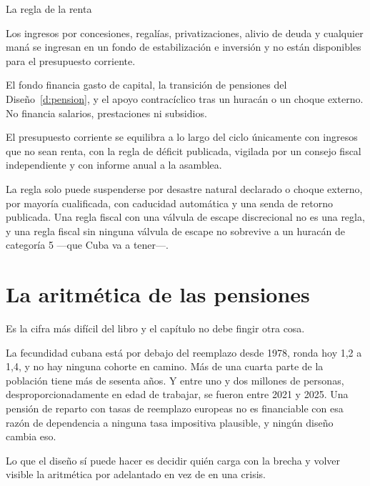 \begin{design}{La regla de la renta}
\label{d:rentrule}
\begin{rules}
 Los ingresos por concesiones, regalías, privatizaciones, alivio de
deuda y cualquier maná se ingresan en un fondo de estabilización e inversión y no
están disponibles para el presupuesto corriente.

 El fondo financia gasto de capital, la transición de pensiones
del Diseño~\ref{d:pension}, y el apoyo contracíclico tras un huracán o un choque
externo. No financia salarios, prestaciones ni subsidios.

 El presupuesto corriente se equilibra a lo largo del ciclo únicamente con
ingresos que no sean renta, con la regla de déficit publicada, vigilada por un consejo
fiscal independiente y con informe anual a la asamblea.

 La regla solo puede suspenderse por desastre natural declarado o choque
externo, por mayoría cualificada, con caducidad automática y una senda de retorno
publicada. Una regla fiscal con una válvula de escape discrecional no es una regla, y
una regla fiscal sin ninguna válvula de escape no sobrevive a un huracán de categoría
5 ---que Cuba va a tener---.
\end{rules}
\end{design}

\section{La aritmética de las pensiones}

Es la cifra más difícil del libro y el capítulo no debe fingir otra cosa.

La fecundidad cubana está por debajo del reemplazo desde 1978, ronda hoy 1,2 a 1,4, y
no hay ninguna cohorte en camino. Más de una cuarta parte de la población tiene más de
sesenta años. Y entre uno y dos millones de personas, desproporcionadamente en edad de
trabajar, se fueron entre 2021 y 2025. Una pensión de reparto con tasas de reemplazo
europeas no es financiable con esa razón de dependencia a ninguna tasa impositiva
plausible, y ningún diseño cambia eso.

Lo que el diseño sí puede hacer es decidir quién carga con la brecha y volver visible la
aritmética por adelantado en vez de en una crisis.

